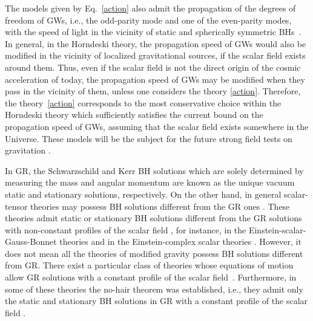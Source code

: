\documentclass[prd,amsmath,amssymb,floatfix,superscriptaddress,notitlepage,nofootinbib,preprintnumbers]{revtex4-1}
\begin{document}
The models given by Eq.~\eqref{action}
also admit the propagation of the degrees of freedom of GWs,
i.e., the odd-parity mode and one of the even-parity modes,
with the speed of light
in the vicinity of static and spherically symmetric BHs~\cite{Kobayashi:2012kh,Kobayashi:2014wsa}.
In general, in the Horndeski theory,
the propagation speed of GWs would also be modified 
in the vicinity of localized gravitational sources,
if the scalar field exists around them.
Thus,
even if the scalar field is not the direct origin of the cosmic acceleration
of today,
the propagation speed of GWs may be modified
when they pass in the vicinity of them,
unless one considers the theory \eqref{action}.
Therefore,
the theory~\eqref{action} 
corresponds to the most conservative choice within the Horndeski theory
which sufficiently satisfies the current bound on the propagation speed of GWs,
assuming that the scalar field exists somewhere in the Universe.
These models will be the subject
for the future strong field tests on gravitation \cite{Berti:2015itd}.



In GR,
the Schwarzschild and Kerr BH solutions
which are solely determined 
by measuring the mass and angular momentum
\cite{Israel:1967wq,Carter:1971zc,Hawking:1971vc}
are known as the unique vacuum static and stationary solutions, respectively.
On the other hand, in general
scalar-tensor theories may possess BH solutions
different from the GR ones
\cite{Bocharova:1970skc,Bekenstein:1974sf,Kanti:1995vq,Radu:2005bp,Pani:2009wy,Anabalon:2009qt,Kleihaus:2011tg,Kolyvaris:2011fk,Anabalon:2012ta,Babichev:2013cya,Anabalon:2013oea,
Sotiriou:2013qea,Minamitsuji:2013ura,Herdeiro:2014goa,Ayzenberg:2014aka,Kobayashi:2014eva,Charmousis:2014zaa,Babichev:2016fbg,Babichev:2017guv,Erices:2017izj}.
These theories
admit static or stationary BH solutions
different from the GR solutions
with non-constant profiles of the scalar field \cite{Herdeiro:2015waa},
for instance,
in the Einstein-scalar-Gauss-Bonnet theories
\cite{Kanti:1995vq,Pani:2009wy,Kleihaus:2011tg,Sotiriou:2013qea,Ayzenberg:2014aka,Doneva:2017bvd,Silva:2017uqg,Antoniou:2017acq,Antoniou:2017hxj}
and in the Einstein-complex scalar theories \cite{Herdeiro:2014goa}.
However, it does not mean all the theories of modified gravity possess BH solutions different from GR.
There exist a particular class of theories whose equations of motion allow 
GR solutions with a constant profile of the scalar field~\cite{Motohashi:2018wdq}. 
Furthermore,
in some of these theories
the no-hair theorem was established, 
i.e., they admit only the static and stationary BH solutions in GR
with a constant profile of the scalar field 
\cite{Chase,Bekenstein:1972ny,Hawking:1972qk,Bekenstein:1995un,Sotiriou:2011dz,Hui:2012qt,Graham:2014mda,Faraoni:2017ock}.
\end{document}
